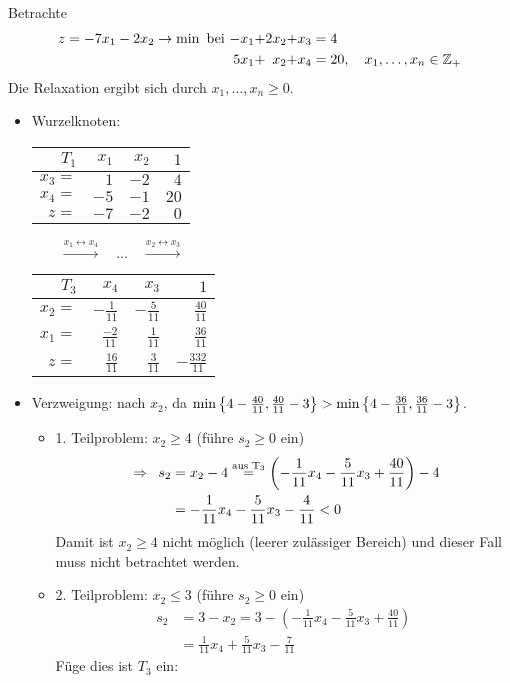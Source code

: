 \begin{beispiel}
	Betrachte 
	\begin{equation*}
	\begin{alignedat}{4}
		z = -7x_1 - 2x_2 \to \min \text{ bei } &&-x_1 &+ &2x_2 &+ &x_3 &= 4 \\
		&&5x_1 &+ &x_2 &+ &x_4 &= 20, \quad x_1, \dots, x_n \in \mathbb{Z}_+
	\end{alignedat}
	\end{equation*}
	Die Relaxation ergibt sich durch $x_1, \dots, x_n \ge 0$.
	\begin{itemize}[leftmargin=*]
		\item Wurzelknoten:
		\begin{center}
			\begin{tabular}{r|rr|r}
				$T_1$ & $x_1$ & $x_2$ & $1$ \\ \hline
				$x_3 = $ & $1$ & $-2$ & $4$ \\
				$x_4 = $ & $-5$ & $-1$ & $20$ \\ \hline
				$z = $   & $-7$ & $-2$ & $0$
			\end{tabular}
			$\qquad \overset{x_1 \leftrightarrow x_4}{\longrightarrow} \quad \dots \quad \overset{x_2 \leftrightarrow x_3}{\longrightarrow} \qquad$
			\begin{tabular}{r|rr|r}
				$T_3$ & $x_4$ & $x_3$ & $1$ \\ \hline
				$x_2 = $ & $-\frac{1}{11}$ & $-\frac{5}{11}$ & $\frac{40}{11}$ \\
				$x_1 = $ & $\frac{-2}{11}$ & $\frac{1}{11}$ & $\frac{36}{11}$ \\ \hline
				$z = $   & $\frac{16}{11}$ & $\frac{3}{11}$ & $-\frac{332}{11}$
			\end{tabular}
		\end{center}	
		\item Verzweigung: nach $x_2$, da $\min \left\{ 4-\frac{40}{11}, \frac{40}{11} - 3 \right\} > \min \left\{ 4 - \frac{36}{11}, \frac{36}{11} - 3 \right\}$. 
		\begin{itemize}
			\item 1. Teilproblem: $x_2 \ge 4$ (führe $s_2 \ge 0$ ein)
			\begin{equation*}
				\begin{aligned}
					\enskip \Rightarrow \enskip s_2 &= x_2 - 4 
					\overset{\text{aus T}_3}{=} \left( -\frac{1}{11}x_4 - \frac{5}{11} x_3 + \frac{40}{11} \right) - 4 \\
					&= -\frac{1}{11} x_4 - \frac{5}{11} x_3 - \frac{4}{11} < 0
				\end{aligned}
			\end{equation*}
			Damit ist $x_2 \ge 4$ nicht möglich (leerer zulässiger Bereich) und dieser Fall muss nicht betrachtet werden.
			\item 2. Teilproblem: $x_2 \le 3$ (führe $s_2 \ge 0$ ein)
			\begin{equation*}
				\begin{aligned}
					s_2 &= 3 - x_2 = 3 - (-\frac{1}{11} x_4 - \frac{5}{11} x_3 + \frac{40}{11}) \\
					&= \frac{1}{11} x_4 + \frac{5}{11} x_3 - \frac{7}{11}
				\end{aligned}
			\end{equation*}
			Füge dies ist $T_3$ ein:
			

\end{itemize}
\end{itemize}
\end{beispiel}
